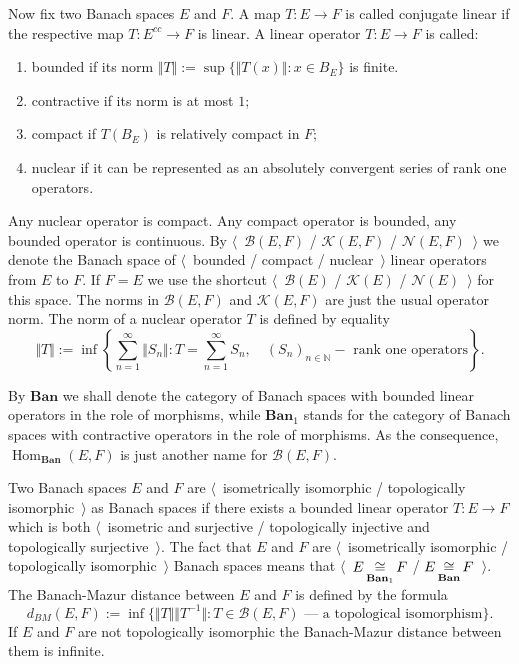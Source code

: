 Now fix two Banach spaces $E$ and $F$. A map $T:E\to F$ is called conjugate
linear if the respective map $T:E^{cc}\to F$ is linear. A linear operator
$T:E\to F$ is called:
\begin{enumerate}[label = (\roman*)]
  \item bounded if its norm $\Vert T\Vert:=\sup \{\Vert T(x)\Vert:x\in B_E \}$ 
  is finite.

  \item contractive if its norm is at most $1$;

  \item compact if $T(B_E)$ is relatively compact in $F$;

  \item nuclear if it can be represented as an absolutely convergent series of
  rank one operators.
\end{enumerate}

Any nuclear operator is compact. Any compact operator is
bounded, any bounded operator is continuous. By $\langle$~$\mathcal{B}(E,F)$ /
$\mathcal{K}(E,F)$ / $\mathcal{N}(E,F)$~$\rangle$ we denote the Banach space of
$\langle$~bounded / compact / nuclear~$\rangle$ linear operators from $E$ to
$F$. If $F=E$ we use the shortcut $\langle$~$\mathcal{B}(E)$ / $\mathcal{K}(E)$
/ $\mathcal{N}(E)$~$\rangle$ for this space. The norms in $\mathcal{B}(E,F)$ and
$\mathcal{K}(E,F)$ are just the usual operator norm. The norm of a nuclear
operator $T$ is defined by equality
$$
\Vert T\Vert
:=\inf\left \{
  \sum_{n=1}^\infty\Vert S_n\Vert
  :T=\sum_{n=1}^\infty S_n,\quad 
  {(S_n)}_{n\in\mathbb{N}} - \mbox{ rank one operators}
\right \}.
$$

By $\mathbf{Ban}$ we shall denote the category of Banach spaces with bounded
linear operators in the role of morphisms, while $\mathbf{Ban}_1$ stands for the
category of Banach spaces with contractive operators in the role of morphisms.
As the consequence, $\operatorname{Hom}_{\mathbf{Ban}}(E,F)$ is just another
name for $\mathcal{B}(E,F)$.

Two Banach spaces $E$ and $F$ are $\langle$~isometrically isomorphic /
topologically isomorphic~$\rangle$ as Banach spaces if there exists a bounded
linear operator $T:E\to F$ which is both $\langle$~isometric and surjective /
topologically injective and topologically surjective~$\rangle$. The fact that
$E$ and $F$ are $\langle$~isometrically isomorphic / topologically
isomorphic~$\rangle$ Banach spaces means that
$\langle$~$E\mathop{\mathbin{\cong}}\limits_{\mathbf{Ban}_1}F$ / $E\mathop{\mathbin{\cong}}\limits_{\mathbf{Ban}}F$~$\rangle$. The
Banach-Mazur distance between $E$ and $F$ is defined by the formula 
$$
d_{BM}(E,F):=\inf \{
  \Vert T\Vert\Vert T^{-1}\Vert
  :T \in \mathcal{B}(E,F) \mbox{ --- a topological isomorphism}
 \}.
$$ 
If $E$ and $F$ are not topologically isomorphic the Banach-Mazur distance
between them is infinite.


